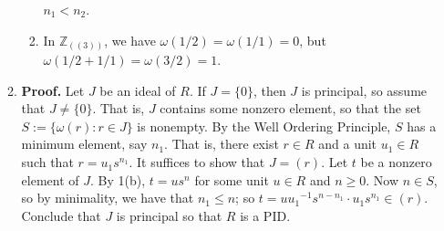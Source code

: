 \documentclass[9pt]{article}
\newcommand{\Z}{\mathbb{Z}}
\begin{document}
\begin{enumerate}
\begin{enumerate}
\begin{enumerate}
                        $n_1 < n_2$.
                  \item In $\Z_{((3))}$, we have $\omega(1/2) = \omega(1/1) = 0$,
                        but $\omega(1/2 + 1/1) = \omega(3/2) = 1$.
               \end{enumerate}
         \item \textbf{Proof.} Let $J$ be an ideal of $R$. If $J = \{0\}$,
               then $J$ is principal, so assume that $J \neq \{0\}$. That is,
               $J$ contains some nonzero element, so that the set
               $S := \{\omega(r) : r \in J\}$ is nonempty. By the Well Ordering
               Principle, $S$ has a minimum element, say $n_1$. That is, there
               exist $r \in R$ and a unit $u_1 \in R$ such that
               $r = u_1s^{n_1}$. It suffices to show that $J = (r)$. Let $t$ be
               a nonzero element of $J$. By 1(b), $t = us^n$ for some unit
               $u \in R$ and $n \ge 0$. Now $n \in S$, so by minimality, we have
               that $n_1 \le n$; so
               $t = u{u_1}^{-1}s^{n-n_1}\cdot u_1s^{n_1} \in (r)$. Conclude that
               $J$ is principal so that $R$ is a PID.
      \end{enumerate}
\end{enumerate}
\end{document}
